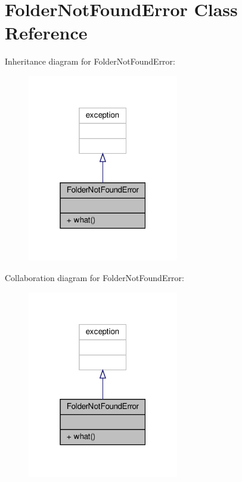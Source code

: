 \hypertarget{classFolderNotFoundError}{}\section{Folder\+Not\+Found\+Error Class Reference}
\label{classFolderNotFoundError}


Inheritance diagram for Folder\+Not\+Found\+Error\+:\nopagebreak
\begin{figure}[H]
\begin{center}
\leavevmode
\includegraphics[width=187pt]{classFolderNotFoundError__inherit__graph}
\end{center}
\end{figure}


Collaboration diagram for Folder\+Not\+Found\+Error\+:\nopagebreak
\begin{figure}[H]
\begin{center}
\leavevmode
\includegraphics[width=187pt]{classFolderNotFoundError__coll__graph}
\end{center}
\end{figure}
